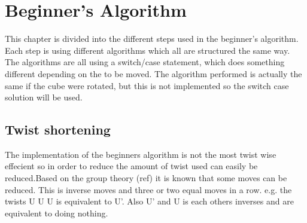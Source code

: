 \chapter{Beginner's Algorithm}
This chapter is divided into the different steps used in the beginner's algorithm.
Each step is using different algorithms which all are structured the same way. The algorithms are all using a switch/case statement, which does something different depending on the \piece{} to be moved. The algorithm performed is actually the same if the cube were rotated, but this is not implemented so the switch case solution will be used.



\section{Twist shortening}
The implementation of the beginners algorithm is not the most twist wise effecient so in order to reduce the amount of twist used can easily be reduced.Based  on the group theory (ref) it is known that some moves can be reduced. This is inverse moves and  three or two equal moves  in a row. e.g.  the twists U U U is equivalent to U'. Also U' and U is each others inverses and are equivalent to doing nothing. 
